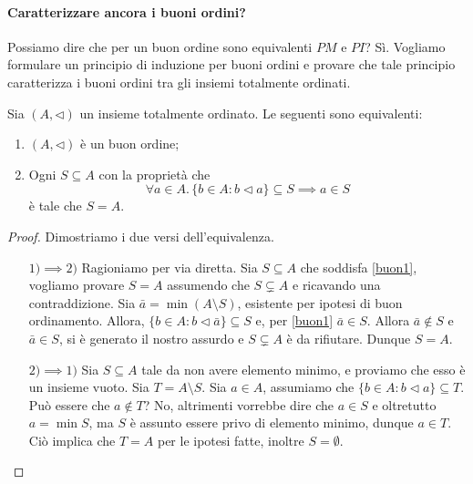 \paragraph{Caratterizzare ancora i buoni ordini?} Possiamo dire che per un buon ordine sono equivalenti \(PM\) e \(PI\)? Sì. Vogliamo formulare un principio di induzione per buoni ordini e provare che tale principio caratterizza i buoni ordini tra gli insiemi totalmente ordinati.

\begin{thm}
  Sia \((A,\lhd)\) un insieme totalmente ordinato. Le seguenti sono equivalenti:
  \begin{enumerate}
    \item \((A,\lhd)\) è un buon ordine;
    \item Ogni \(S \subseteq A\) con la proprietà che
    \begin{equation}
      \forall a \in A.\, \lbrace b \in A \colon b \lhd a\rbrace \subseteq S \implies a \in S \label{buon1}
      \end{equation} è tale che \(S = A\).
  \end{enumerate}
\end{thm}
\begin{proof} Dimostriamo i due versi dell'equivalenza.
  \begin{itemize}
    \item[\(1) \implies 2)\)] Ragioniamo per via diretta. Sia \(S \subseteq A\) che soddisfa \eqref{buon1}, vogliamo provare \(S = A\) assumendo che \(S \subsetneq A\) e ricavando una contraddizione. Sia \(\bar{a} = \min (A \setminus S)\), esistente per ipotesi di buon ordinamento. Allora, \(\lbrace b \in A \colon b \lhd \bar{a} \rbrace \subseteq S\) e, per \eqref{buon1} \(\bar{a} \in S\). Allora \(\bar{a} \notin S\) e \(\bar{a} \in S\), si è generato il nostro assurdo e \(S \subsetneq A\) è da rifiutare. Dunque \(S = A\).
    \item[\(2) \implies 1)\)] Sia \(S \subseteq A\) tale da non avere elemento minimo, e proviamo che esso è un insieme vuoto. Sia \(T = A \setminus S\). Sia \(a \in A\), assumiamo che \(\lbrace b \in A \colon b \lhd a \rbrace \subseteq T\). Può essere che \(a \notin T\)? No, altrimenti vorrebbe dire che \(a \in S\) e oltretutto \(a = \min S\), ma \(S\) è assunto essere privo di elemento minimo, dunque \(a \in T\). Ciò implica che \(T = A\) per le ipotesi fatte, inoltre \(S = \emptyset\).
  \end{itemize}
\end{proof}

